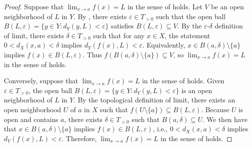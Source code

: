 \begin{proof}
    Suppose that $\lim_{x \to a} f(x) = L$ in the sense of  holds. Let $V$ be an open neighborhood of $L$ in $Y$. By , there exists $\varepsilon \in T_{>0}$ such that the open ball $B(L, \varepsilon) = \{y \in Y : d_Y(y,L) < \varepsilon\}$ satisfies $B(L, \varepsilon) \subseteq V$. By the $\varepsilon$-$\delta$ definition of limit, there exists $\delta \in T_{>0}$ such that for any $x \in X$, the statement $0 < d_X(x,a) < \delta$ implies $d_Y(f(x), L) < \varepsilon$. Equivalently, $x \in B(a, \delta) \setminus \{a\}$ implies $f(x) \in B(L, \varepsilon)$. Thus $f(B(a, \delta) \setminus \{a\}) \subseteq V$, so $\lim_{x \to a} f(x) = L$ in the sense of  holds.

    Conversely, suppose that $\lim_{x \to a} f(x) = L$ in the sense of  holds. Given $\varepsilon \in T_{>0}$, the open ball $B(L, \varepsilon) = \{y \in Y : d_Y(y,L) < \varepsilon\}$ is an open neighborhood of $L$ in $Y$. By the topological definition of limit, there exists an open neighborhood $U$ of $a$ in $X$ such that $f(U \setminus \{a\}) \subseteq B(L, \varepsilon)$. Because $U$ is open and contains $a$, there exists $\delta \in T_{>0}$ such that $B(a, \delta) \subseteq U$. We then have that $x \in B(a, \delta) \setminus \{a\}$ implies $f(x) \in B(L, \varepsilon)$, i.e., $0 < d_X(x,a) < \delta$ implies $d_Y(f(x), L) < \varepsilon$. Therefore, $\lim_{x \to a} f(x) = L$ in the sense of  holds.
\end{proof}